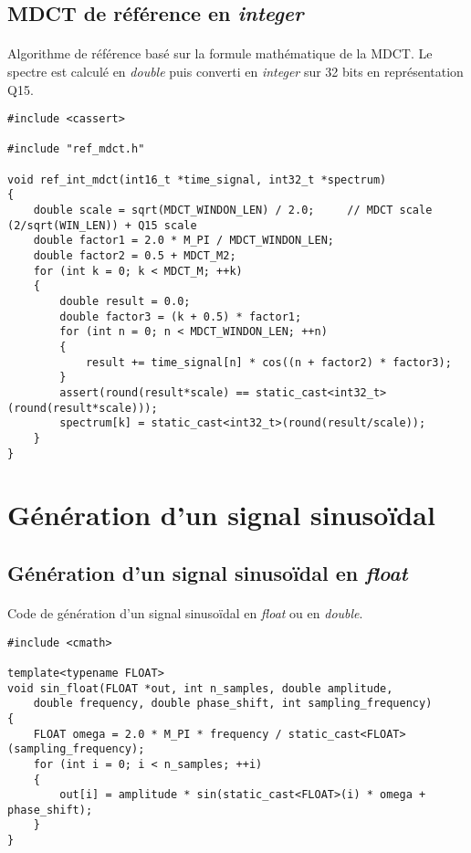 \documentclass{article}
\begin{document}
\subsection{MDCT de référence en \emph{integer}}\label{app:mdct_ref_int}
\paragraph{}
Algorithme de référence basé sur la formule mathématique de la MDCT. Le spectre est calculé en \emph{double} puis converti en \emph{integer} sur 32 bits en représentation Q15.
\lstset{language=C++}
\begin{lstlisting}
#include <cassert>

#include "ref_mdct.h"

void ref_int_mdct(int16_t *time_signal, int32_t *spectrum)
{
    double scale = sqrt(MDCT_WINDON_LEN) / 2.0;     // MDCT scale (2/sqrt(WIN_LEN)) + Q15 scale
    double factor1 = 2.0 * M_PI / MDCT_WINDON_LEN;
    double factor2 = 0.5 + MDCT_M2;
    for (int k = 0; k < MDCT_M; ++k)
    {
        double result = 0.0;
        double factor3 = (k + 0.5) * factor1;
        for (int n = 0; n < MDCT_WINDON_LEN; ++n)
        {
            result += time_signal[n] * cos((n + factor2) * factor3);
        }
        assert(round(result*scale) == static_cast<int32_t>(round(result*scale)));
        spectrum[k] = static_cast<int32_t>(round(result/scale));
    }
}
\end{lstlisting}


\newpage
\section{Génération d'un signal sinusoïdal}\label{app:sin_wave}
\subsection{Génération d'un signal sinusoïdal en \emph{float}}\label{app:sin_wave_float}
\paragraph{}
Code de génération d'un signal sinusoïdal en \emph{float} ou en \emph{double}.
\lstset{language=C++}
\begin{lstlisting}
#include <cmath>

template<typename FLOAT>
void sin_float(FLOAT *out, int n_samples, double amplitude,
    double frequency, double phase_shift, int sampling_frequency)
{
    FLOAT omega = 2.0 * M_PI * frequency / static_cast<FLOAT>(sampling_frequency);
    for (int i = 0; i < n_samples; ++i)
    {
        out[i] = amplitude * sin(static_cast<FLOAT>(i) * omega + phase_shift);
    }
}
\end{lstlisting}
\end{document}
